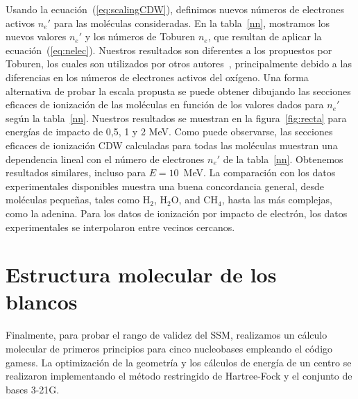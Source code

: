 Usando la ecuación~(\ref{eq:scalingCDW}), definimos nuevos números de 
electrones activos $n_e'$ para las moléculas consideradas. En la 
tabla~\ref{nn}, mostramos los nuevos valores $n_e'$ y los números de 
Toburen $n_e$, que resultan de aplicar la ecuación~(\ref{eq:nelec}). 
Nuestros resultados son diferentes a los propuestos por Toburen, los 
cuales son utilizados por otros autores~\cite{itoh2013}, principalmente 
debido a las diferencias en los números de electrones activos del 
oxígeno. Una forma alternativa de probar la escala propusta se puede
obtener dibujando las secciones eficaces de ionización de las moléculas 
en función de los valores dados para $n_e'$ según la tabla~\ref{nn}. 
Nuestros resultados se muestran en la figura~\ref{fig:recta} para 
energías de impacto de 0,5, 1 y 2 MeV. Como puede observarse, las 
secciones eficaces de ionización CDW calculadas para todas las moléculas 
muestran una dependencia lineal con el número de electrones $n_e'$ de 
la tabla~\ref{nn}. Obtenemos resultados similares, incluso para 
$E=10$~MeV. La comparación con los datos experimentales disponibles 
muestra una buena concordancia general, desde moléculas pequeñas, tales
como H$_2$, H$_2$O, and CH$_4$, hasta las más complejas, como la adenina. 
Para los datos de ionización por impacto de electrón, los datos 
experimentales se interpolaron entre vecinos cercanos. 


\section{Estructura molecular de los blancos}
\label{sec:molcalculations}

Finalmente, para probar el rango de validez del SSM, realizamos un 
cálculo molecular de primeros principios para cinco nucleobases 
empleando el código {\sc gamess}. La optimización de la geometría y los 
cálculos de energía de un centro se realizaron implementando el método
restringido de Hartree-Fock y el conjunto de bases 3-21G. 


